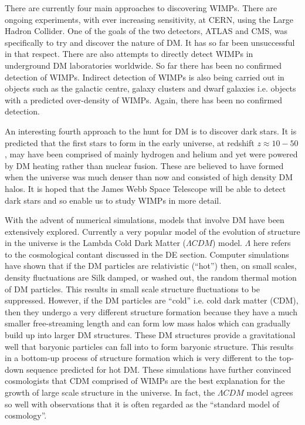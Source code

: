 \documentclass[a4paper,12pt]{article}
\begin{document}
There are currently four main approaches to discovering WIMPs. There are ongoing experiments, with ever increasing sensitivity, at CERN, using
the Large Hadron Collider. One of the goals of the two detectors, ATLAS and CMS, was specifically to try and discover the nature of DM. It has so far been unsuccessful in that respect.
There are also attempts to directly detect WIMPs in underground DM laboratories worldwide. So far there has been no confirmed detection of WIMPs. Indirect detection of WIMPs is also being
carried out in objects such as the galactic centre, galaxy clusters and dwarf galaxies i.e. objects with a predicted over-density of WIMPs. Again, there has been no confirmed detection.

An interesting fourth approach to the hunt for DM is to discover dark stars. It is predicted that the first stars to form in the early universe, at redshift $z\approx 10-50$, may have been 
comprised of mainly hydrogen and helium and yet were powered by DM heating rather than nuclear fusion. These are believed to have formed when the universe was much denser than now and 
consisted of high density DM halos. It is hoped that the James Webb Space Telescope will be able to detect dark stars and so enable us to study WIMPs in more detail.

With the advent of numerical simulations, models that involve DM have been extensively explored. Currently a very popular model of the evolution of structure in the universe is
the Lambda Cold Dark Matter ($\Lambda CDM$) model. $\Lambda$ here refers to the cosmological contant discussed in the DE section. 
Computer simulations have shown that if the DM particles are relativistic (``hot'') then, on small scales, density fluctuations are Silk damped, or
washed out, the random thermal motion of DM particles. This results in small scale structure fluctuations to be suppressed. However, if the DM particles are ``cold'' i.e. cold dark matter (CDM), then
they undergo a very different structure formation because they have a much smaller free-streaming length and can form low mass halos which can gradually build up into larger DM
structures. These DM structures provide a gravitational well that baryonic particles can fall into to form baryonic structure. This results in a bottom-up process of structure 
formation which is very different to the top-down sequence predicted for hot DM. These simulations have further convinced cosmologists that CDM comprised of WIMPs are the best
explanation for the growth of large scale structure in the universe. In fact, the $\Lambda CDM$ model agrees so well with observations that it is often regarded as the ``standard model
of cosmology''.
\end{document}
